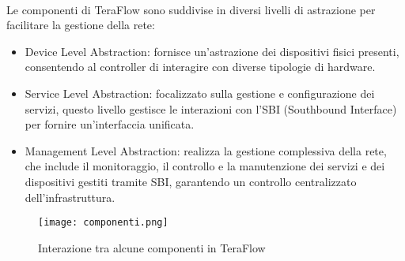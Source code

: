\\Le componenti di TeraFlow sono suddivise in diversi livelli di astrazione per facilitare la gestione della rete:
\begin{itemize}
\item Device Level Abstraction: fornisce un'astrazione dei dispositivi fisici presenti, consentendo al controller di interagire con diverse tipologie di hardware.
\item Service Level Abstraction: focalizzato sulla gestione e configurazione dei servizi, questo livello gestisce le interazioni con l'SBI (Southbound Interface) per fornire un'interfaccia unificata.
\item Management Level Abstraction: realizza la gestione complessiva della rete, che include il monitoraggio, il controllo e la manutenzione dei servizi e dei dispositivi gestiti tramite SBI, garantendo un controllo centralizzato dell'infrastruttura.
\end{itemize}
\begin{figure}[h]
    \centering
   \texttt{[image: componenti.png]}
    \caption{Interazione tra alcune componenti in TeraFlow}
    \label{fig:componenti}
\end{figure}



